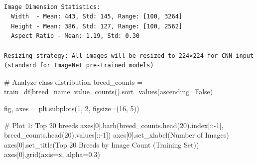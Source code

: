 \documentclass[
  letterpaper,
  DIV=11,
  numbers=noendperiod]{scrartcl}
\newenvironment{Shaded}{\begin{snugshade}}{\end{snugshade}}
\newcommand{\CommentTok}[1]{\textcolor[rgb]{0.37,0.37,0.37}{#1}}
\newcommand{\DecValTok}[1]{\textcolor[rgb]{0.68,0.00,0.00}{#1}}
\newcommand{\FloatTok}[1]{\textcolor[rgb]{0.68,0.00,0.00}{#1}}
\newcommand{\NormalTok}[1]{\textcolor[rgb]{0.00,0.23,0.31}{#1}}
\newcommand{\OperatorTok}[1]{\textcolor[rgb]{0.37,0.37,0.37}{#1}}
\newcommand{\StringTok}[1]{\textcolor[rgb]{0.13,0.47,0.30}{#1}}
\newcommand{\VariableTok}[1]{\textcolor[rgb]{0.07,0.07,0.07}{#1}}
\renewenvironment{Shaded}{%
  \begin{tcolorbox}[%
    enhanced,%
    colback=codebg,%
    colframe=codebg,%
    borderline west={3pt}{0pt}{sectionblue},%
    boxrule=0pt,%
    arc=0pt,%
    boxsep=5pt,%
    left=2mm,%
    right=2mm,%
    top=2mm,%
    bottom=2mm%
  ]%
}{%
  \end{tcolorbox}%
}
\begin{document}
\begin{verbatim}

Image Dimension Statistics:
  Width  - Mean: 443, Std: 145, Range: [100, 3264]
  Height - Mean: 386, Std: 127, Range: [100, 2562]
  Aspect Ratio - Mean: 1.19, Std: 0.30

Resizing strategy: All images will be resized to 224×224 for CNN input (standard for ImageNet pre-trained models)
\end{verbatim}

\begin{Shaded}
\begin{Highlighting}[]
\CommentTok{\# Analyze class distribution}
\NormalTok{breed\_counts }\OperatorTok{=}\NormalTok{ train\_df[}\StringTok{\textquotesingle{}breed\_name\textquotesingle{}}\NormalTok{].value\_counts().sort\_values(ascending}\OperatorTok{=}\VariableTok{False}\NormalTok{)}

\NormalTok{fig, axes }\OperatorTok{=}\NormalTok{ plt.subplots(}\DecValTok{1}\NormalTok{, }\DecValTok{2}\NormalTok{, figsize}\OperatorTok{=}\NormalTok{(}\DecValTok{16}\NormalTok{, }\DecValTok{5}\NormalTok{))}

\CommentTok{\# Plot 1: Top 20 breeds}
\NormalTok{axes[}\DecValTok{0}\NormalTok{].barh(breed\_counts.head(}\DecValTok{20}\NormalTok{).index[::}\OperatorTok{{-}}\DecValTok{1}\NormalTok{], breed\_counts.head(}\DecValTok{20}\NormalTok{).values[::}\OperatorTok{{-}}\DecValTok{1}\NormalTok{])}
\NormalTok{axes[}\DecValTok{0}\NormalTok{].set\_xlabel(}\StringTok{\textquotesingle{}Number of Images\textquotesingle{}}\NormalTok{)}
\NormalTok{axes[}\DecValTok{0}\NormalTok{].set\_title(}\StringTok{\textquotesingle{}Top 20 Breeds by Image Count (Training Set)\textquotesingle{}}\NormalTok{)}
\NormalTok{axes[}\DecValTok{0}\NormalTok{].grid(axis}\OperatorTok{=}\StringTok{\textquotesingle{}x\textquotesingle{}}\NormalTok{, alpha}\OperatorTok{=}\FloatTok{0.3}\NormalTok{)}


\end{Highlighting}
\end{Shaded}
\end{document}
